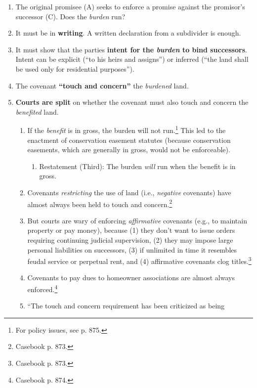 \begin{enumerate}
    \item The original promisee (A) seeks to enforce a promise against the 
    promisor's  successor (C). Does the \emph{burden} run?
    \item It must be in \textbf{writing}. A written declaration from a 
    subdivider is enough.
    \item It must show that the parties \textbf{intent for the \emph{burden} 
    to bind successors}. Intent can be explicit (``to his heirs and assigns'') 
    or inferred (``the land shall be used only for residential purposes'').
    \item The covenant \textbf{``touch and concern''} the \emph{burdened} 
    land.
    \item \textbf{Courts are split} on whether the covenant must also touch 
    and concern the \emph{benefited} land.
    \begin{enumerate}
        \item If the \emph{benefit} is in gross, the burden will not 
        run.\footnote{For policy issues, see p. 875.}
        This led to the enactment of conservation easement statutes (because 
        conservation easements, which are generally in gross, would not be 
        enforceable).
        \begin{enumerate}
            \item Restatement (Third): The burden \emph{will} run when the 
            benefit is in gross.
        \end{enumerate}
        \item Covenants \emph{restricting} the use of land (i.e., 
        \emph{negative} covenants) have almost always been held to touch and 
        concern.\footnote{Casebook p. 873.}
        \item But courts are wary of enforcing \emph{affirmative} covenants 
        (e.g., to maintain property or pay money), because (1) they don't want 
        to issue orders requiring continuing judicial supervision, (2) they 
        may impose large personal liabilities on successors, (3) if unlimited 
        in time it resembles feudal service or perpetual rent, and (4) 
        affirmative covenants clog titles.\footnote{Casebook p. 873.}
        \item Covenants to pay dues to homeowner associations are almost 
        always enforced.\footnote{Casebook p. 874.}
        \item ``The touch and concern requirement has been criticized as being 

\end{enumerate}
\end{enumerate}
